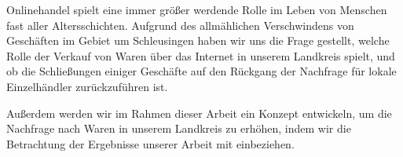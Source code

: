 Onlinehandel spielt eine immer größer werdende Rolle im Leben von Menschen fast aller Altersschichten. Aufgrund des allmählichen Verschwindens von Geschäften im Gebiet um Schleusingen haben wir uns die Frage gestellt, welche Rolle der Verkauf von Waren über das Internet in unserem Landkreis spielt, und ob die Schließungen einiger Geschäfte auf den Rückgang der Nachfrage für lokale Einzelhändler zurückzuführen ist.

Außerdem werden wir im Rahmen dieser Arbeit ein Konzept entwickeln, um die Nachfrage nach Waren in unserem Landkreis zu erhöhen, indem wir die Betrachtung der Ergebnisse unserer Arbeit mit einbeziehen.
